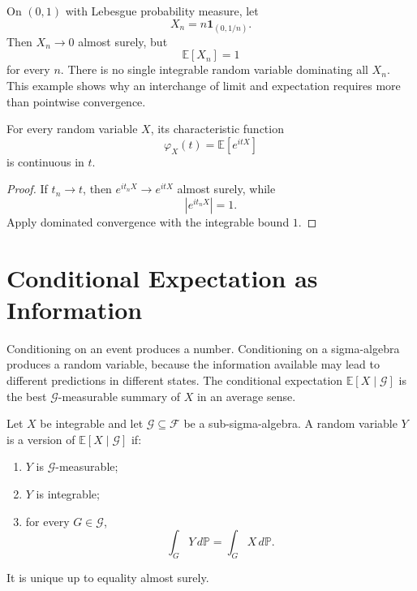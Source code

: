 \begin{example}
On $(0,1)$ with Lebesgue probability measure, let
\[
    X_n=n\mathbf{1}_{(0,1/n)}.
\]
Then $X_n\to0$ almost surely, but
\[
    \mathbb{E}[X_n]=1
\]
for every $n$. There is no single integrable random variable dominating all $X_n$. This example shows why an interchange of limit and expectation requires more than pointwise convergence.
\end{example}

\begin{corollary}
For every random variable $X$, its characteristic function
\[
    \varphi_X(t)=\mathbb{E}[e^{itX}]
\]
is continuous in $t$.
\end{corollary}

\begin{proof}
If $t_n\to t$, then $e^{it_nX}\to e^{itX}$ almost surely, while
\[
    |e^{it_nX}|=1.
\]
Apply dominated convergence with the integrable bound $1$.
\end{proof}

\section{Conditional Expectation as Information}

Conditioning on an event produces a number. Conditioning on a sigma-algebra produces a random variable, because the information available may lead to different predictions in different states. The conditional expectation $\mathbb{E}[X\mid\mathcal{G}]$ is the best $\mathcal{G}$-measurable summary of $X$ in an average sense.

\begin{definition}
Let $X$ be integrable and let $\mathcal{G}\subseteq\mathcal{F}$ be a sub-sigma-algebra. A random variable $Y$ is a version of $\mathbb{E}[X\mid\mathcal{G}]$ if:
\begin{enumerate}
    \item $Y$ is $\mathcal{G}$-measurable;
    \item $Y$ is integrable;
    \item for every $G\in\mathcal{G}$,
    \[
        \int_GY\,d\mathbb{P}=\int_GX\,d\mathbb{P}.
    \]
\end{enumerate}
It is unique up to equality almost surely.
\end{definition}

